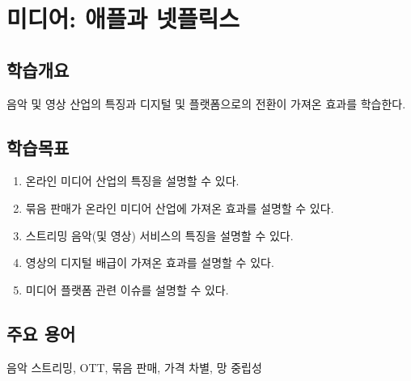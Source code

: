\chapter{미디어: 애플과 넷플릭스}\label{cha:media}

\section*{학습개요}
음악 및 영상 산업의 특징과 디지털 및 플랫폼으로의 전환이 가져온 효과를 학습한다.

\section*{학습목표}
\begin{enumerate}
\item 온라인 미디어 산업의 특징을 설명할 수 있다.
\item 묶음 판매가 온라인 미디어 산업에 가져온 효과를 설명할 수 있다.
\item 스트리밍 음악(및 영상) 서비스의 특징을 설명할 수 있다.
\item 영상의 디지털 배급이 가져온 효과를 설명할 수 있다.
\item 미디어 플랫폼 관련 이슈를 설명할 수 있다.
\end{enumerate}

\section*{주요 용어}
음악 스트리밍, OTT, 묶음 판매, 가격 차별, 망 중립성 

\pagebreak

